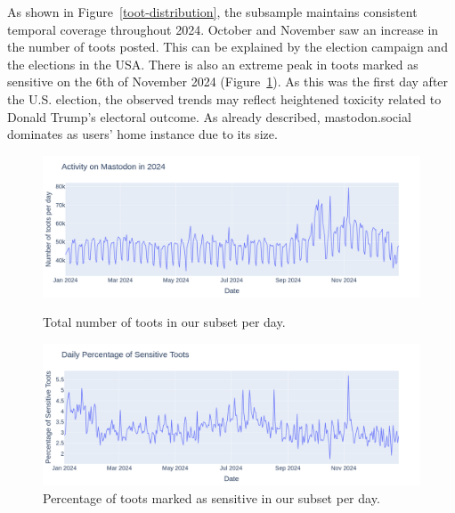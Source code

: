 As shown in Figure~\ref{toot-distribution}, the subsample maintains consistent temporal coverage throughout 2024. October and November saw an increase in the number of toots posted. This can be explained by the election campaign and the elections in the USA. There is also an extreme peak in toots marked as sensitive on the 6th of November 2024 (Figure~\ref{sensitive-toots}). As this was the first day after the U.S. election, the observed trends may reflect heightened toxicity related to Donald Trump’s electoral outcome. As \citet{he:2023} already described, mastodon.social dominates as users' home instance due to its size.

\begin{figure}[tb]
    \centering
    \includegraphics[width=\textwidth]{../material/activity_2024.png}
    \caption{Total number of toots in our subset per day.}
    \label{toot-distribution}
    \includegraphics[width=\textwidth]{../material/sensitive_toots.png}
    \caption{Percentage of toots marked as sensitive in our subset per day.}
    \label{sensitive-toots}
\end{figure}